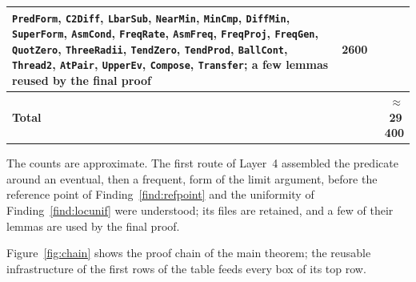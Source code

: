 \documentclass[11pt,reqno]{amsart}
\theoremstyle{plain}
\theoremstyle{definition}
\begin{document}
{\begin{longtable}{@{}p{}p{}r@{}}
{  \texttt{PredForm}, \texttt{C2Diff}, \texttt{LbarSub}, \texttt{NearMin},
  \texttt{MinCmp}, \texttt{DiffMin}, \texttt{SuperForm}, \texttt{AsmCond},
  \texttt{FreqRate}, \texttt{AsmFreq}, \texttt{FreqProj}, \texttt{FreqGen},
  \texttt{QuotZero}, \texttt{ThreeRadii}, \texttt{TendZero}, \texttt{TendProd},
  \texttt{BallCont}, \texttt{Thread2}, \texttt{AtPair}, \texttt{UpperEv},
  \texttt{Compose}, \texttt{Transfer}; a few lemmas reused by the final proof}
                            & 2600 \\
\midrule
\textbf{Total}              &                                                & \textbf{$\approx$29\,400} \\
\end{longtable}}


The counts are approximate. The first
route of Layer~4 assembled the predicate around an
eventual, then a frequent, form of the limit argument, before the reference
point of Finding~\ref{find:refpoint} and the uniformity of
Finding~\ref{find:locunif} were understood; its files are retained, and a few of
their lemmas are used by the final proof.

Figure~\ref{fig:chain} shows the proof chain of the main theorem; the
reusable infrastructure of the first rows of the table feeds every box of its
top row.
\end{document}
